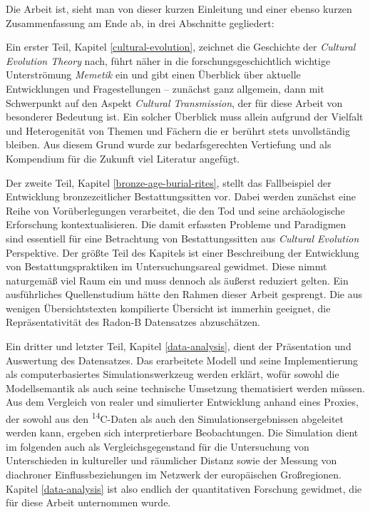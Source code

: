 \documentclass[openany,twoside,twocolumn]{book}
\begin{document}
Die Arbeit ist, sieht man von dieser kurzen Einleitung und einer ebenso
kurzen Zusammenfassung am Ende ab, in drei Abschnitte gegliedert:

Ein erster Teil, Kapitel \ref{cultural-evolution}, zeichnet die
Geschichte der \emph{Cultural Evolution Theory} nach, führt näher in die
forschungsgeschichtlich wichtige Unterströmung \emph{Memetik} ein und
gibt einen Überblick über aktuelle Entwicklungen und Fragestellungen --
zunächst ganz allgemein, dann mit Schwerpunkt auf den Aspekt
\emph{Cultural Transmission}, der für diese Arbeit von besonderer
Bedeutung ist. Ein solcher Überblick muss allein aufgrund der Vielfalt
und Heterogenität von Themen und Fächern die er berührt stets
unvollständig bleiben. Aus diesem Grund wurde zur bedarfsgerechten
Vertiefung und als Kompendium für die Zukunft viel Literatur angefügt.

Der zweite Teil, Kapitel \ref{bronze-age-burial-rites}, stellt das
Fallbeispiel der Entwicklung bronzezeitlicher Bestattungssitten vor.
Dabei werden zunächst eine Reihe von Vorüberlegungen verarbeitet, die
den Tod und seine archäologische Erforschung kontextualisieren. Die
damit erfassten Probleme und Paradigmen sind essentiell für eine
Betrachtung von Bestattungssitten aus \emph{Cultural Evolution}
Perspektive. Der größte Teil des Kapitels ist einer Beschreibung der
Entwicklung von Bestattungspraktiken im Untersuchungsareal gewidmet.
Diese nimmt naturgemäß viel Raum ein und muss dennoch als äußerst
reduziert gelten. Ein ausführliches Quellenstudium hätte den Rahmen
dieser Arbeit gesprengt. Die aus wenigen Übersichtstexten kompilierte
Übersicht ist immerhin geeignet, die Repräsentativität des Radon-B
Datensatzes abzuschätzen.

Ein dritter und letzter Teil, Kapitel \ref{data-analysis}, dient der
Präsentation und Auswertung des Datensatzes. Das erarbeitete Modell und
seine Implementierung als computerbasiertes Simulationswerkzeug werden
erklärt, wofür sowohl die Modellsemantik als auch seine technische
Umsetzung thematisiert werden müssen. Aus dem Vergleich von realer und
simulierter Entwicklung anhand eines Proxies, der sowohl aus den
\textsuperscript{14}C-Daten als auch den Simulationsergebnissen
abgeleitet werden kann, ergeben sich interpretierbare Beobachtungen. Die
Simulation dient im folgenden auch als Vergleichsgegenstand für die
Untersuchung von Unterschieden in kultureller und räumlicher Distanz
sowie der Messung von diachroner Einflussbeziehungen im Netzwerk der
europäischen Großregionen. Kapitel \ref{data-analysis} ist also endlich
der quantitativen Forschung gewidmet, die für diese Arbeit unternommen
wurde.
\end{document}
